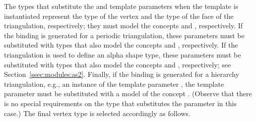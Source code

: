 The types that substitute the  and  template parameters when the template  is instantiated represent the type of the vertex and the type of the face of the triangulation, respectively; they must model the concepts  and , respectively. If the binding is generated for a periodic triangulation, these parameters
must be substituted with types that also model the concepts  and , respectively. If the triangulation is used to define an alpha shape type, these parameters must be substituted with types that also model the concepts  and , respectively; see Section~\ref{ssec:modules:as2}. Finally, if the binding is generated for a hierarchy triangulation, e.g., an instance of the template parameter , the  template parameter must be substituted with a model of the concept . (Observe that there is no special requirements on the type that substitutes the  parameter in this case.) The final vertex type is selected accordingly as follows.

